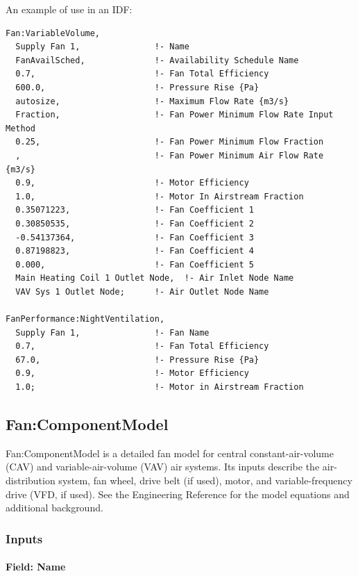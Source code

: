 An example of use in an IDF:

\begin{lstlisting}
Fan:VariableVolume,
  Supply Fan 1,               !- Name
  FanAvailSched,              !- Availability Schedule Name
  0.7,                        !- Fan Total Efficiency
  600.0,                      !- Pressure Rise {Pa}
  autosize,                   !- Maximum Flow Rate {m3/s}
  Fraction,                   !- Fan Power Minimum Flow Rate Input Method
  0.25,                       !- Fan Power Minimum Flow Fraction
  ,                           !- Fan Power Minimum Air Flow Rate {m3/s}
  0.9,                        !- Motor Efficiency
  1.0,                        !- Motor In Airstream Fraction
  0.35071223,                 !- Fan Coefficient 1
  0.30850535,                 !- Fan Coefficient 2
  -0.54137364,                !- Fan Coefficient 3
  0.87198823,                 !- Fan Coefficient 4
  0.000,                      !- Fan Coefficient 5
  Main Heating Coil 1 Outlet Node,  !- Air Inlet Node Name
  VAV Sys 1 Outlet Node;      !- Air Outlet Node Name

FanPerformance:NightVentilation,
  Supply Fan 1,               !- Fan Name
  0.7,                        !- Fan Total Efficiency
  67.0,                       !- Pressure Rise {Pa}
  0.9,                        !- Motor Efficiency
  1.0;                        !- Motor in Airstream Fraction
\end{lstlisting}

\subsection{Fan:ComponentModel}\label{fancomponentmodel}

Fan:ComponentModel is a detailed fan model for central constant-air-volume (CAV) and variable-air-volume (VAV) air systems. Its inputs describe the air-distribution system, fan wheel, drive belt (if used), motor, and variable-frequency drive (VFD, if used). See the Engineering Reference for the model equations and additional background.

\subsubsection{Inputs}\label{inputs-5-011}

\paragraph{Field: Name}\label{field-name-4-011}

